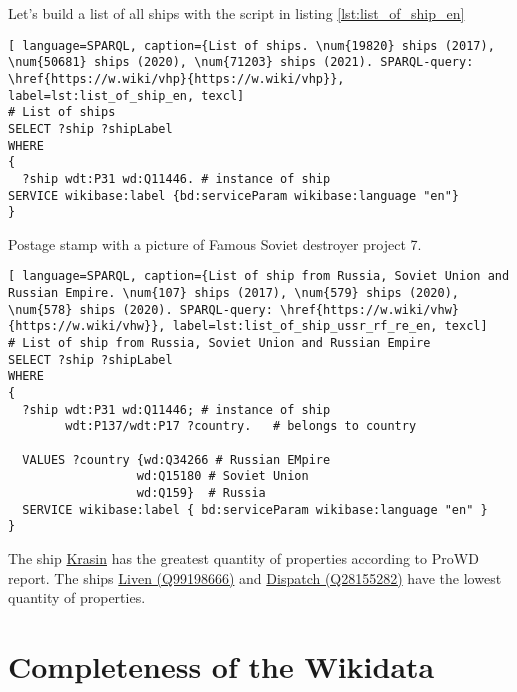 Let's build a list of all ships with the script in listing \ref{lst:list_of_ship_en}


\begin{lstlisting}[ language=SPARQL, caption={List of ships. \num{19820} ships (2017), \num{50681} ships (2020), \num{71203} ships (2021). SPARQL-query: \href{https://w.wiki/vhp}{https://w.wiki/vhp}}, label=lst:list_of_ship_en, texcl]
# List of ships
SELECT ?ship ?shipLabel
WHERE
{
  ?ship wdt:P31 wd:Q11446. # instance of ship
SERVICE wikibase:label {bd:serviceParam wikibase:language "en"}
}
\end{lstlisting}


\begin{marginfigure}[0.0cm]
  {
    \setlength{\fboxsep}{0pt}%
    \setlength{\fboxrule}{1pt}%
  }
  \caption[Soviet destroyer project 7]{Postage stamp with a picture of Famous Soviet destroyer project 7.}%
  \label{fig:quiz_question_ship}%
\end{marginfigure}
\label{question:ship_1}
  
\begin{lstlisting}[ language=SPARQL, caption={List of ship from Russia, Soviet Union and Russian Empire. \num{107} ships (2017), \num{579} ships (2020), \num{578} ships (2020). SPARQL-query: \href{https://w.wiki/vhw}{https://w.wiki/vhw}}, label=lst:list_of_ship_ussr_rf_re_en, texcl]
# List of ship from Russia, Soviet Union and Russian Empire
SELECT ?ship ?shipLabel
WHERE
{
  ?ship wdt:P31 wd:Q11446; # instance of ship
        wdt:P137/wdt:P17 ?country.   # belongs to country
    
  VALUES ?country {wd:Q34266 # Russian EMpire
                  wd:Q15180 # Soviet Union
                  wd:Q159}  # Russia
  SERVICE wikibase:label { bd:serviceParam wikibase:language "en" }
}
\end{lstlisting}

The ship \href{https://www.wikidata.org/wiki/Q281147}{Krasin} has the greatest quantity of properties according to ProWD report.
The ships \href{https://www.wikidata.org/wiki/Q99198666}{Liven (Q99198666)} and \href{https://www.wikidata.org/wiki/Q28155282}{Dispatch (Q28155282)} have the lowest quantity of properties.


\section{Completeness of the Wikidata}


